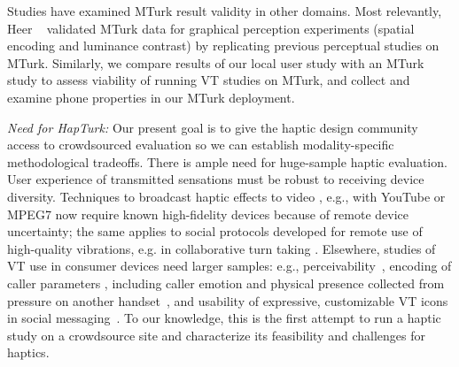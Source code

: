 Studies have examined MTurk result validity in other domains. 
Most relevantly, Heer \etal~\cite{visualperceptionturk} validated MTurk data for graphical perception experiments (spatial encoding and luminance contrast) by replicating previous perceptual studies on MTurk. %
Similarly, we compare results of our local user study with an MTurk study to assess viability of running VT studies on MTurk, and collect and examine phone properties in our MTurk deployment. 

{\it Need for HapTurk:} Our present goal is to give the haptic design community access to crowdsourced evaluation so we can establish modality-specific methodological tradeoffs.
%
There is ample need for huge-sample haptic evaluation. User experience of transmitted sensations must be robust to receiving device diversity.
Techniques to broadcast haptic effects to video \cite{Modhrain2001,Kim2009}, e.g., with YouTube \cite{AbdurRahman2010} or MPEG7 \cite{Eid2006,Ferre2008} now require known high-fidelity devices  because of remote device uncertainty;  
the same applies to social protocols developed for remote use of high-quality vibrations, e.g. in collaborative turn taking \cite{Chan2008}. 
Elsewhere, studies of VT use in consumer devices need larger samples: e.g., 
perceivability~\cite{Kaaresoja2005}, encoding of caller parameters \cite{Brown2006b}, including caller
emotion and physical presence collected from pressure on another handset~\cite{Hoggan2012}, and usability of expressive, customizable VT icons in social messaging~\cite{Israr2015}.
%
To our knowledge, this is the first attempt to run a haptic study on a crowdsource site and characterize its feasibility and challenges for haptics. 
			
